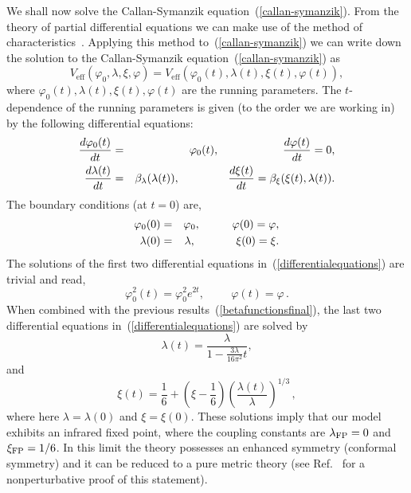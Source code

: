 We shall now solve the Callan-Symanzik
equation~(\ref{callan-symanzik}). From the theory of partial
differential equations we can make use of the method of
characteristics~\cite{Buchbinder:1992rb,Elizalde:1993ew,cc,bkmn}. 
Applying this method to~(\ref{callan-symanzik}) 
we can write down the solution to the
Callan-Symanzik equation~(\ref{callan-symanzik}) as
\begin{equation}
V_{\mathrm{eff}}(\varphi_0, \lambda, \xi, \varphi) =
V_{\mathrm{eff}}(\varphi_0(t), \lambda (t), \xi(t), \varphi (t)),
\label{solutionofC-S}
\end{equation}
where $\varphi_0(t), \lambda(t), \xi(t), \varphi(t)$ are the running
parameters. The $t$-dependence of the running parameters is given
(to the order we are working in) by the following
differential equations:
\begin{eqnarray}
\frac{d\varphi_0(t)}{dt} & = & \varphi_0(t),
\hspace{2cm}
\frac{d\varphi(t)}{dt} = 0,
\nonumber\\
\frac{d\lambda(t)}{dt} & = & \beta_{\lambda}(\lambda (t)),
\hspace{1.52cm} \frac{d\xi(t)}{dt} =  \beta_{\xi}(\xi(t),
\lambda(t)). \label{differentialequations}
\end{eqnarray}
The boundary conditions (at $t=0$) are,
\begin{eqnarray}
\varphi_0(0) & = & \varphi_0, \hspace{1cm}
\varphi(0) = \varphi,\nonumber\\
\lambda(0) & = & \lambda, \hspace{1.27cm} \xi(0) = \xi.
\end{eqnarray}
The solutions of the first two differential equations
in~(\ref{differentialequations}) are trivial and read,
\begin{equation}
\varphi_0^2(t) = \varphi_0^2e^{2t}, \hspace{1cm} \varphi(t) = \varphi
\,.
\end{equation}
When combined with the previous results~(\ref{betafunctionsfinal}),
the last two differential equations
in~(\ref{differentialequations}) are solved by
\begin{equation}
\lambda(t) = \frac{\lambda}{1-\frac{3\lambda}{16\pi^2}t},
\label{running:lambda}
\end{equation}
and
\begin{equation}
\xi(t) = \frac16 + (\xi -
\frac16)\left(\frac{\lambda(t)}{\lambda}\right)^{1/3}
\,,
\label{running:xi}
\end{equation}
where here $\lambda=\lambda(0)$ and $\xi=\xi(0)$.
 These solutions imply that our model exhibits an infrared
fixed point, where the coupling constants are $\lambda_{\rm FP} = 0$
and $\xi_{\rm FP} = 1/6$. In this limit the theory possesses
an enhanced symmetry (conformal symmetry) and
it can be reduced to a pure metric theory
(see Ref.~\cite{Tsamis:1984hh} for a nonperturbative proof of this statement). 


